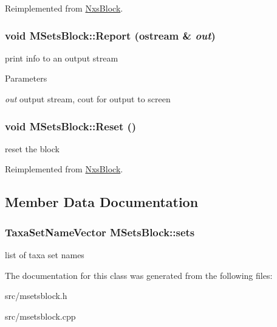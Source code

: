 Reimplemented from \hyperlink{classNxsBlock}{NxsBlock}.\hypertarget{classMSetsBlock_a88203ea243140fc5402abfecb41ee2c7}{
\subsubsection[{Report}]{\setlength{\rightskip}{0pt plus 5cm}void MSetsBlock::Report (ostream \& {\em out})}}
\label{classMSetsBlock_a88203ea243140fc5402abfecb41ee2c7}
print info to an output stream 
\begin{DoxyParams}{Parameters}
\item[{\em out}]output stream, cout for output to screen \end{DoxyParams}
\hypertarget{classMSetsBlock_a64e9ca54bba770d1a663de30dfca2073}{
\subsubsection[{Reset}]{\setlength{\rightskip}{0pt plus 5cm}void MSetsBlock::Reset ()}}
\label{classMSetsBlock_a64e9ca54bba770d1a663de30dfca2073}
reset the block 

Reimplemented from \hyperlink{classNxsBlock}{NxsBlock}.

\subsection{Member Data Documentation}
\hypertarget{classMSetsBlock_a30ed727f77895254e40487fc27ae2c97}{
\subsubsection[{sets}]{\setlength{\rightskip}{0pt plus 5cm}TaxaSetNameVector {\bf MSetsBlock::sets}}}
\label{classMSetsBlock_a30ed727f77895254e40487fc27ae2c97}
list of taxa set names 

The documentation for this class was generated from the following files:\begin{DoxyCompactItemize}
\item 
src/msetsblock.h\item 
src/msetsblock.cpp\end{DoxyCompactItemize}
